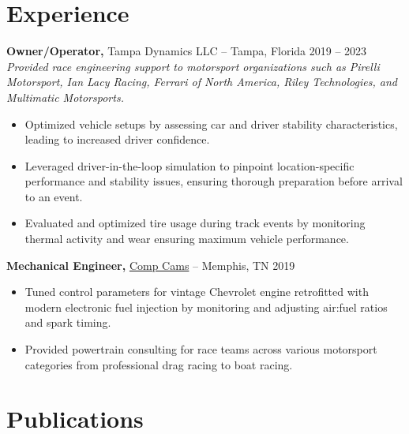 \documentclass[12pt,letterpaper]{article} %
\begin{document}
\section*{Experience}
\textbf{Owner/Operator,} Tampa Dynamics LLC -- Tampa, Florida \hfill 2019 -- 2023 \\
\vspace{3pt}
\textit{Provided race engineering support to motorsport organizations such as Pirelli Motorsport, Ian Lacy Racing, Ferrari of North America, Riley Technologies, and Multimatic Motorsports.}
\vspace{-5pt}
\begin{itemize}
  \item Optimized vehicle setups by assessing car and driver stability characteristics, leading to increased driver confidence.
  \item Leveraged driver-in-the-loop simulation to pinpoint location-specific performance and stability issues, ensuring thorough preparation before arrival to an event.
  \item Evaluated and optimized tire usage during track events by monitoring thermal activity and wear ensuring maximum vehicle performance.
\end{itemize}

\textbf{Mechanical Engineer,} \href{https://www.compcams.com/}{Comp Cams} -- Memphis, TN \hfill 2019 \\
\vspace{-9pt}
\begin{itemize}
  \item Tuned control parameters for vintage Chevrolet engine retrofitted with modern electronic fuel injection by monitoring and adjusting air:fuel ratios and spark timing.
  \item Provided powertrain consulting for race teams across various motorsport categories from professional drag racing to boat racing.
\end{itemize}

\vspace{-20pt} %


\section*{Publications}
\end{document}
